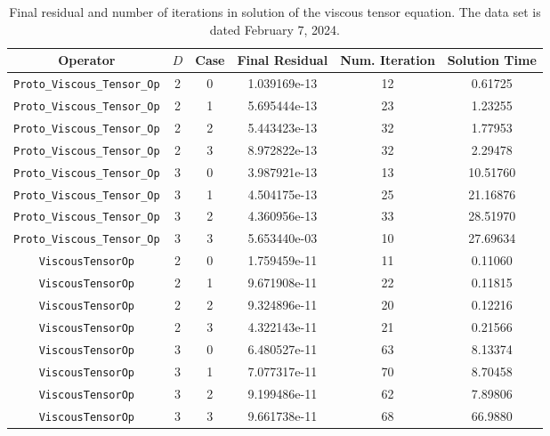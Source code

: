 \documentclass{article}
\begin{document}
\begin{small}
\begin{table}
\begin{center}
\begin{tabular}{|c|c|c|c|c||c|} \hline
 Operator                   & $D$ & Case & Final Residual &
 Num. Iteration & Solution Time\\
\hline
 {\tt Proto\_Viscous\_Tensor\_Op} & 2   & 0    & 1.039169e-13   & 12  & 0.61725  \\
 {\tt Proto\_Viscous\_Tensor\_Op} & 2   & 1    & 5.695444e-13   & 23  & 1.23255  \\
 {\tt Proto\_Viscous\_Tensor\_Op} & 2   & 2    & 5.443423e-13   & 32  & 1.77953  \\
 {\tt Proto\_Viscous\_Tensor\_Op} & 2   & 3    & 8.972822e-13   & 32  & 2.29478  \\
 {\tt Proto\_Viscous\_Tensor\_Op} & 3   & 0    & 3.987921e-13   & 13  & 10.51760  \\
 {\tt Proto\_Viscous\_Tensor\_Op} & 3   & 1    & 4.504175e-13   & 25  & 21.16876  \\
 {\tt Proto\_Viscous\_Tensor\_Op} & 3   & 2    & 4.360956e-13   & 33  & 28.51970  \\
 {\tt Proto\_Viscous\_Tensor\_Op} & 3   & 3    & 5.653440e-03   & 10  & 27.69634  \\
\hline                                                      
 {\tt ViscousTensorOp}            & 2   & 0    & 1.759459e-11   & 11  & 0.11060  \\
 {\tt ViscousTensorOp}            & 2   & 1    & 9.671908e-11   & 22  & 0.11815  \\
 {\tt ViscousTensorOp}            & 2   & 2    & 9.324896e-11   & 20  & 0.12216  \\
 {\tt ViscousTensorOp}            & 2   & 3    & 4.322143e-11   & 21  & 0.21566  \\
 {\tt ViscousTensorOp}            & 3   & 0    & 6.480527e-11   & 63  & 8.13374  \\
 {\tt ViscousTensorOp}            & 3   & 1    & 7.077317e-11   & 70  & 8.70458  \\
 {\tt ViscousTensorOp}            & 3   & 2    & 9.199486e-11   & 62  & 7.89806  \\
 {\tt ViscousTensorOp}            & 3   & 3    & 9.661738e-11   & 68  & 66.9880  \\
\hline
\end{tabular}
\end{center}
\label{tab::viscous}
\caption
    {
      Final residual and number of iterations in solution of the
      viscous tensor equation.
      The data set is dated February 7, 2024.
    }
\end{table}
\end{small}
\end{document}
